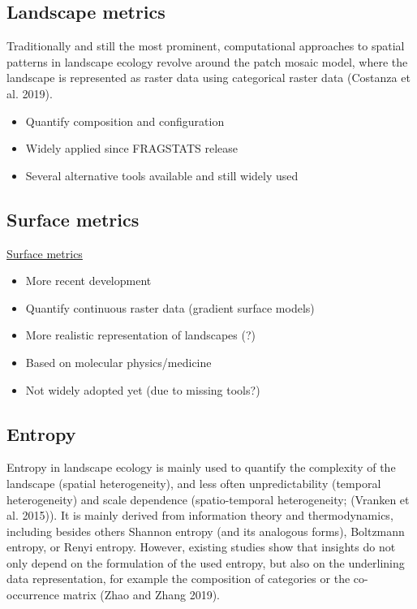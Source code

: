 \documentclass[
  12pt,
  a4paperpaper,
]{article}
\providecommand{\tightlist}{%
  \setlength{\itemsep}{0pt}\setlength{\parskip}{0pt}}\usepackage{longtable,booktabs,array}
\begin{document}
\subsection{Landscape metrics}\label{landscape-metrics}

Traditionally and still the most prominent, computational approaches to
spatial patterns in landscape ecology revolve around the patch mosaic
model, where the landscape is represented as raster data using
categorical raster data (Costanza et al. 2019).

\begin{itemize}
\tightlist
\item
  Quantify composition and configuration
\item
  Widely applied since FRAGSTATS release
\item
  Several alternative tools available and still widely used
\end{itemize}

\subsection{Surface metrics}\label{surface-metrics}

\href{https://doi.org/10.1007/s10980-018-0685-1}{Surface metrics}

\begin{itemize}
\tightlist
\item
  More recent development
\item
  Quantify continuous raster data (gradient surface models)
\item
  More realistic representation of landscapes (?)
\item
  Based on molecular physics/medicine
\item
  Not widely adopted yet (due to missing tools?)
\end{itemize}

\subsection{Entropy}\label{entropy}

Entropy in landscape ecology is mainly used to quantify the complexity
of the landscape (spatial heterogeneity), and less often
unpredictability (temporal heterogeneity) and scale dependence
(spatio-temporal heterogeneity; (Vranken et al. 2015)). It is mainly
derived from information theory and thermodynamics, including besides
others Shannon entropy (and its analogous forms), Boltzmann entropy, or
Renyi entropy. However, existing studies show that insights do not only
depend on the formulation of the used entropy, but also on the
underlining data representation, for example the composition of
categories or the co-occurrence matrix (Zhao and Zhang 2019).
\end{document}
